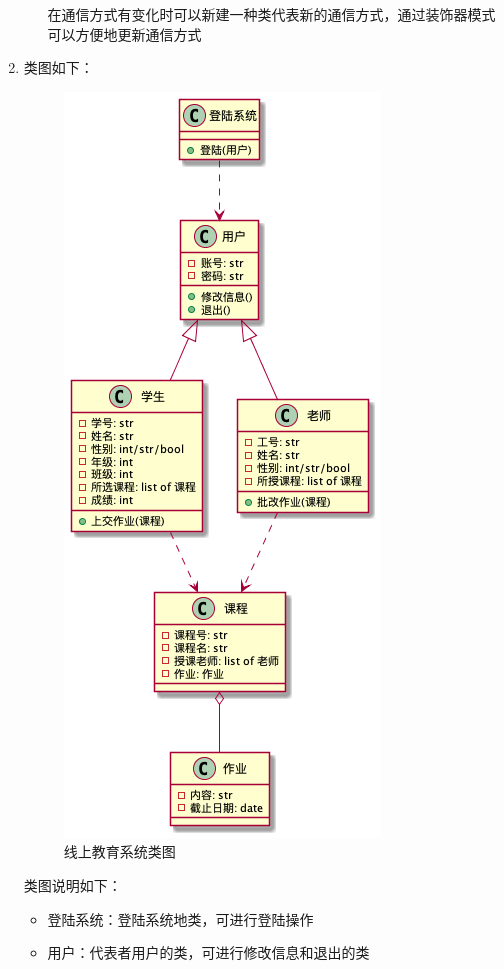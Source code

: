 \documentclass{article}
\begin{document}
\begin{enumerate}[label=\arabic*.]
\begin{itemize}
            在通信方式有变化时可以新建一种类代表新的通信方式，通过装饰器模式可以方便地更新通信方式
        \end{itemize}
        \item 类图如下：\\
        \begin{figure}[H]
            \centering
            \includegraphics[scale=0.5]{./fig/hw02/2.png}
            \caption{线上教育系统类图}
        \end{figure}
        类图说明如下：\\
        \begin{itemize}
            \item 登陆系统：登陆系统地类，可进行登陆操作
            \item 用户：代表者用户的类，可进行修改信息和退出的类

\end{itemize}
\end{enumerate}
\end{document}
